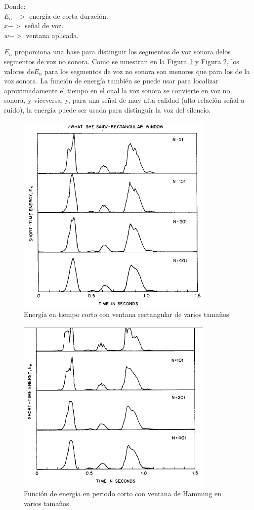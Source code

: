 Donde:
\\$E_n->$ energía de corta duración.
\\$x->$ señal de voz.
\\$w->$ ventana aplicada.

$E_n$ proporciona una base para distinguir los segmentos de voz sonora delos segmentos de voz no sonora. Como se muestran en la Figura \ref{fig:energiaRectangular} y Figura \ref{fig:energiaHamming}, los valores de$ E_n$ para los segmentos de voz no sonora son menores que para los de la voz sonora. La función de energía también se puede usar para localizar aproximadamente el tiempo en el cual la voz sonora se convierte en voz no sonora, y viceversa, y, para una señal de muy alta calidad (alta relación señal a ruido), la energía puede ser usada para distinguir la voz del silencio.

\begin{figure}[H]
	\centering
	\includegraphics[width=0.5\linewidth]{figures/energiaRectangular}
	\caption{Energía en tiempo corto con ventana rectangular de varios tamaños}
	\label{fig:energiaRectangular}
\end{figure}

\begin{figure}[H]
	\centering
	\includegraphics[width=0.5\linewidth]{figures/energiaHamming}
	\caption{Función de energía en periodo corto con ventana de Hamming en varios tamaños}
	\label{fig:energiaHamming}
\end{figure}

